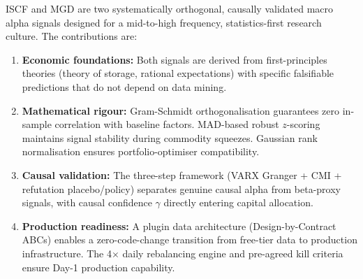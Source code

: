 \documentclass[11pt]{article}
\begin{document}
ISCF and MGD are two systematically orthogonal, causally validated macro alpha signals designed for a mid-to-high frequency, statistics-first research culture. The contributions are:
\begin{enumerate}
\item \textbf{Economic foundations:} Both signals are derived from first-principles theories (theory of storage, rational expectations) with specific falsifiable predictions that do not depend on data mining.
\item \textbf{Mathematical rigour:} Gram-Schmidt orthogonalisation guarantees zero in-sample correlation with baseline factors. MAD-based robust $z$-scoring maintains signal stability during commodity squeezes. Gaussian rank normalisation ensures portfolio-optimiser compatibility.
\item \textbf{Causal validation:} The three-step framework (VARX Granger + CMI + refutation placebo/policy) separates genuine causal alpha from beta-proxy signals, with causal confidence $\gamma$ directly entering capital allocation.
\item \textbf{Production readiness:} A plugin data architecture (Design-by-Contract ABCs) enables a zero-code-change transition from free-tier data to production infrastructure. The 4$\times$ daily rebalancing engine and pre-agreed kill criteria ensure Day-1 production capability.
\end{enumerate}
\end{document}
